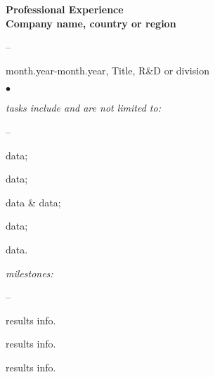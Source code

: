 \documentclass[oneside,final,10pt]{extreport}
\newenvironment{compactlist}{
	\begin{list}{{$\bullet$}}{
		\setlength\leftmargin{0.4cm}
		\setlength\partopsep{0pt}
		\setlength\parskip{0pt}
		\setlength\parsep{0pt}
		\setlength\topsep{0pt}
		\setlength\itemsep{0pt}
	}
}{
	\end{list}
}
\newenvironment{innerlist}{
	\begin{list}{--}{
		\setlength\leftmargin{0.8cm}
		\setlength\partopsep{0pt}
		\setlength\parskip{0pt}
		\setlength\parsep{0pt}
		\setlength\topsep{0pt}
		\setlength\itemsep{0pt}
	}
}{
	\end{list}
}
\begin{document}
\bfseries
Professional Experience \\
\mdseries
Company name, country or region
\mdseries
 \begin{innerlist}
      \bfseries
      \item month.year-month.year, Title, R\&D or division
      \mdseries
           \begin{compactlist}
                \item \textsl{tasks include and are not limited to:}
                     \begin{innerlist}
                          \item data;
                          \item data;
                          \item data \& data;
                          \item data;
                          \item data. 
                     \end{innerlist}
                \item \textsl{milestones:}
                     \begin{innerlist}
                          \item results info.
                          \item results info.
                          \item results info.\\[1pt]
                     \end{innerlist}     
           \end{compactlist}
 \end{innerlist}
\end{document}
